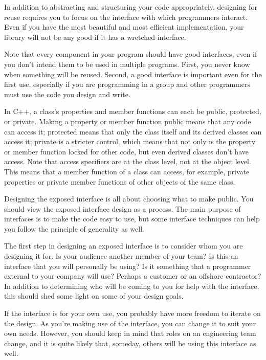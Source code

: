 
In addition to abstracting and structuring your code appropriately, designing for reuse requires you to focus on the interface with which programmers interact. Even if you have the most beautiful and most efficient implementation, your library will not be any good if it has a wretched interface.

Note that every component in your program should have good interfaces, even if you don’t intend them to be used in multiple programs. First, you never know when something will be reused. Second, a good interface is important even for the first use, especially if you are programming in a group and other programmers must use the code you design and write.

In C++, a class’s properties and member functions can each be public, protected, or private. Making a property or member function public means that any code can access it; protected means that only the class itself and its derived classes can access it; private is a stricter control, which means that not only is the property or member function locked for other code, but even derived classes don’t have access. Note that access specifiers are at the class level, not at the object level. This means that a member function of a class can access, for example, private properties or private member functions of other objects of the same class.

Designing the exposed interface is all about choosing what to make public. You should view the exposed interface design as a process. The main purpose of interfaces is to make the code easy to use, but some interface techniques can help you follow the principle of generality as well.


The first step in designing an exposed interface is to consider whom you are designing it for. Is your audience another member of your team? Is this an interface that you will personally be using? Is it something that a programmer external to your company will use? Perhaps a customer or an offshore contractor? In addition to determining who will be coming to you for help with the interface, this should shed some light on some of your design goals.

If the interface is for your own use, you probably have more freedom to iterate on the design. As you’re making use of the interface, you can change it to suit your own needs. However, you should keep in mind that roles on an engineering team change, and it is quite likely that, someday, others will be using this interface as well.

